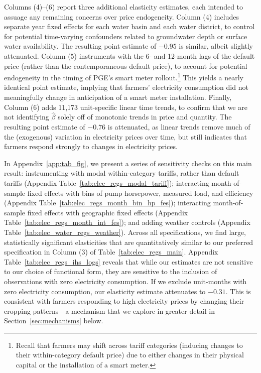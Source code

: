 Columns (4)--(6) report three additional elasticity estimates, each intended to assuage any remaining concerns over price endogeneity. Column (4) includes separate year fixed effects for each water basin and each water district, to control for potential time-varying confounders related to groundwater depth or surface water availability. The resulting point estimate of $-0.95$ is similar, albeit slightly attenuated. Column (5) instruments with the 6- and 12-month lags of the default price (rather than the contemporaneous default price), to account for potential endogeneity in the timing of PGE's smart meter rollout.\footnote{
Recall that farmers may shift across tariff categories (inducing changes to their within-category default price) due to either changes in their physical capital or the installation of a smart meter.
} This yields a nearly identical point estimate, implying that farmers' electricity consumption did not meaningfully change in anticipation of a smart meter installation. Finally, Column (6) adds 11,173 unit-specific linear time trends, to confirm that we are not identifying $\hat \beta$ solely off of monotonic trends in price and quantity. The resulting point estimate of $-0.76$ is attenuated, as linear trends remove much of the (exogenous) variation in electricity prices over time, but still indicates that farmers respond strongly to changes in electricity prices. 


In Appendix~\ref{app:tab_fig}, we present a series of sensitivity checks on this main result: instrumenting with modal within-category tariffs, rather than default tariffs (Appendix Table~\ref{tab:elec_regs_modal_tariff}); interacting month-of-sample fixed effects with bins of pump horsepower, measured load, and efficiency (Appendix Table~\ref{tab:elec_regs_month_bin_hp_fes}); interacting month-of-sample fixed effects with geographic fixed effects (Appendix Table~\ref{tab:elec_regs_month_int_fes}); and adding weather controls (Appendix Table~\ref{tab:elec_water_regs_weather}). Across all specifications, we find large, statistically significant elasticities that are quantitatively similar to our preferred specification in Column (3) of Table~\ref{tab:elec_regs_main}. Appendix Table~\ref{tab:elec_regs_ihs_logs} reveals that while our estimates are not sensitive to our choice of functional form, they are sensitive to the inclusion of observations with zero electricity consumption. If we exclude unit-months with zero electricity consumption, our elasticity estimate attenuates to $-0.31$. This is consistent with farmers responding to high electricity prices by changing their cropping patterns---a mechanism that we explore in greater detail in Section~\ref{sec:mechanisms} below. 



